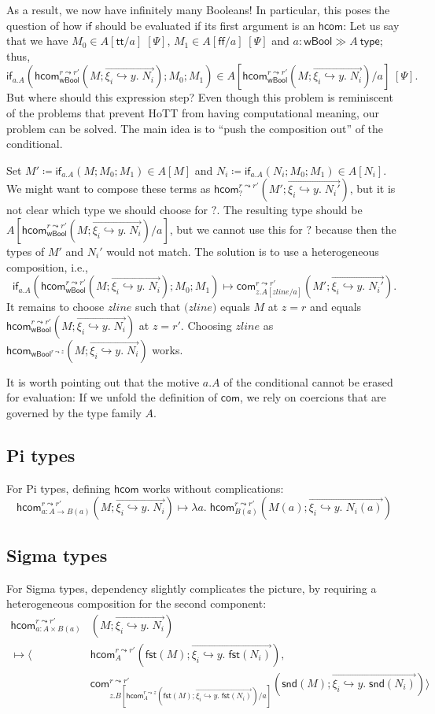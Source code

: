 \documentclass{article} \usepackage{chtt-notes} \usepackage{stmaryrd}
\newcommand{\wbool}{\mathsf{wBool}}
\newcommand{\hcom}{\mathsf{hcom}}
\newcommand{\com}{\mathsf{com}}
\newcommand{\itype}[1]{#1~\mathsf{type}}
\newcommand{\di}[1]{\;[#1]}
\newcommand{\ps}{\di{\Psi}}
\newcommand{\T}{\mathsf{tt}}
\newcommand{\F}{\mathsf{ff}}
\newcommand{\If}{\mathsf{if}}
\newcommand{\hcomr}{(M; \overrightarrow{\xi_i \hookrightarrow y. \; N_i})}
\newcommand{\fst}{\mathsf{fst}}
\newcommand{\snd}{\mathsf{snd}}
\begin{document}
As a result, we now have infinitely many Booleans! In particular, this poses the question of how $\If$ should be evaluated if its first argument is an $\hcom$:
Let us say that we have $M_0 \in A[\T / a] \ps$, $M_1 \in A[\F/a] \ps$ and $a : \wbool \gg \itype{A}$; thus, 
\[\If_{a.A}(\hcom_{\wbool}^{r \leadsto r'}\hcomr; M_0; M_1) \in A[\hcom_{\wbool}^{r \leadsto r'}\hcomr/a] \ps.\]
But where should this expression step? Even though this problem is reminiscent of the problems that prevent HoTT from having computational meaning, our problem can be solved.
The main idea is to ``push the composition out'' of the conditional.

Set $M' \coloneqq \If_{a.A}(M; M_0; M_1) \in A[M]$ and $N_i \coloneqq \If_{a.A}(N_i; M_0; M_1) \in A[N_i]$.
We might want to compose these terms as $\hcom_{?}^{r \leadsto r'}(M'; \overrightarrow{\xi_i \hookrightarrow y.\; N_i'})$, but it is not clear which type we should choose for $?$.
The resulting type should be $A[\hcom_{\wbool}^{r \leadsto r'}\hcomr/a]$, but we cannot use this for $?$ because then the types of $M'$ and $N_i'$ would not match.
The solution is to use a heterogeneous composition, i.e.,
\[ \If_{a.A}(\hcom_{\wbool}^{r \leadsto r'}\hcomr; M_0; M_1) \mapsto \com_{z.A[\mathit{zline} / a]}^{r \leadsto r'}(M'; \overrightarrow{\xi_i \hookrightarrow y.\; N_i'}). \]
It remains to choose $\mathit{zline}$ such that $\mathit(zline)$ equals $M$ at $z = r$ and equals $\hcom_{\wbool}^{r \leadsto r'}\hcomr$ at $z = r'$.
Choosing $\mathit{zline}$ as $\hcom_{\wbool^{r \leadsto z}}\hcomr$ works.

It is worth pointing out that the motive $a.A$ of the conditional cannot be erased for evaluation: If we unfold the definition of $\com$, we rely on coercions that are governed by the type family $A$.

\subsection{Pi types}
For Pi types, defining $\hcom$ works without complications:
\[ \hcom_{a : A \to B(a)}^{r \leadsto r'}\hcomr \mapsto \lambda a. \; \hcom_{B(a)}^{r \leadsto r'}(M(a); \overrightarrow{\xi_i \hookrightarrow y.\;N_i(a)}) \]

\subsection{Sigma types}
For Sigma types, dependency slightly complicates the picture, by requiring a heterogeneous composition for the second component:
\begin{align*}
    \hcom_{a:A \times B(a)}^{r \leadsto r'}&\hcomr \\
    \mapsto \langle &\hcom_{A}^{r \leadsto r'}(\fst(M); \overrightarrow{\xi_i \hookrightarrow y.\;\fst(N_i)}), \\
    &\com_{z. B[ \hcom_{A}^{r \leadsto z}(\fst(M); \overrightarrow{\xi_i \hookrightarrow y.\;\fst(N_i)}) /a]}^{r \leadsto r'}(\snd(M); \overrightarrow{\xi_i \hookrightarrow y.\; \snd(N_i)}) \rangle
\end{align*}
\end{document}
